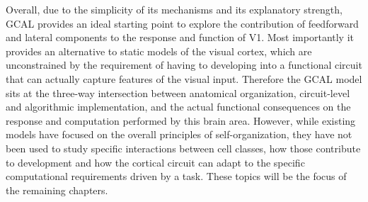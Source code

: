 Overall, due to the simplicity of its mechanisms and its explanatory
strength, GCAL provides an ideal starting point to explore the
contribution of feedforward and lateral components to the response and
function of V1. Most importantly it provides an alternative to
static models of the visual cortex, which are unconstrained by the
requirement of having to developing into a functional circuit that can
actually capture features of the visual input. Therefore the GCAL
model sits at the three-way intersection between anatomical
organization, circuit-level and algorithmic implementation, and the
actual functional consequences on the response and computation
performed by this brain area. However, while existing models have
focused on the overall principles of self-organization, they have not
been used to study specific interactions between cell classes, how
those contribute to development and how the cortical circuit can adapt
to the specific computational requirements driven by a task.  These
topics will be the focus of the remaining chapters.
